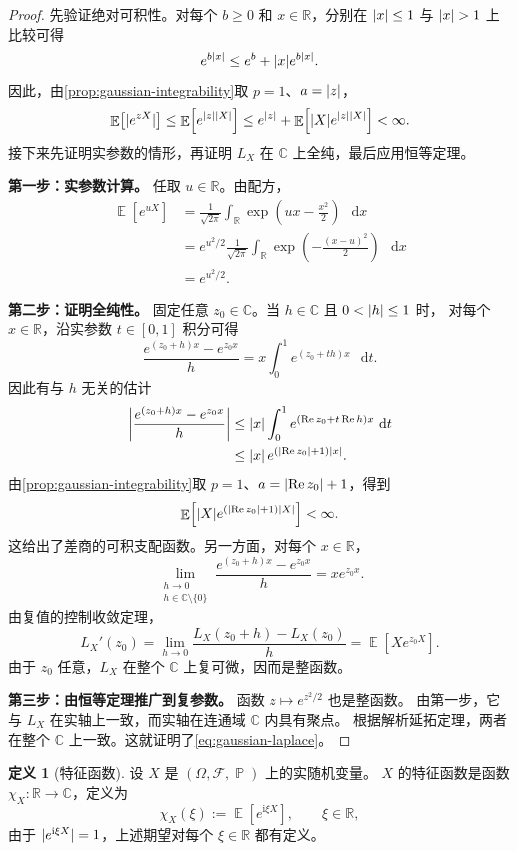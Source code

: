 \documentclass[UTF8,11pt,a4paper,oneside,fontset=fandol]{ctexrep}
\numberwithin{equation}{section}
\theoremstyle{plain}
\theoremstyle{definition}
\newtheorem{definition}[theorem]{定义}
\theoremstyle{remark}
\newcommand{\R}{\mathbb{R}}
\newcommand{\C}{\mathbb{C}}
\newcommand{\F}{\mathcal{F}}
\DeclareMathOperator{\Prob}{\mathbb{P}}
\DeclareMathOperator{\E}{\mathbb{E}}
\newcommand{\dd}{\mathop{}\!\mathrm{d}}
\DeclarePairedDelimiter{\abs}{\lvert}{\rvert}
\begin{document}
\begin{proof}
先验证绝对可积性。对每个 $b\ge0$ 和 $x\in\R$，分别在
$\abs{x}\le1$ 与 $\abs{x}>1$ 上比较可得
\[
  e^{b\abs{x}}\le e^b+\abs{x}e^{b\abs{x}}.
\]
因此，由\cref{prop:gaussian-integrability}取 $p=1$、$a=\abs{z}$，
\[
  \E\!\left[\abs{e^{zX}}\right]
  \le \E\!\left[e^{\abs{z}\abs{X}}\right]
  \le e^{\abs{z}}+\E\!\left[\abs{X}e^{\abs{z}\abs{X}}\right]
  <\infty.
\]
接下来先证明实参数的情形，再证明 $L_X$ 在 $\C$ 上全纯，最后应用恒等定理。

\textbf{第一步：实参数计算。}
任取 $u\in\R$。由配方，
\begin{align*}
  \E\!\left[e^{uX}\right]
  &=\frac{1}{\sqrt{2\pi}}
    \int_{\R}\exp\!\left(ux-\frac{x^2}{2}\right)\,\dd x\\
  &=e^{u^2/2}\frac{1}{\sqrt{2\pi}}
    \int_{\R}\exp\!\left(-\frac{(x-u)^2}{2}\right)\,\dd x\\
  &=e^{u^2/2}.
\end{align*}

\textbf{第二步：证明全纯性。}
固定任意 $z_0\in\C$。当 $h\in\C$ 且 $0<\abs{h}\le1$ 时，
对每个 $x\in\R$，沿实参数 $t\in[0,1]$ 积分可得
\[
  \frac{e^{(z_0+h)x}-e^{z_0x}}{h}
  =x\int_0^1 e^{(z_0+th)x}\,\dd t.
\]
因此有与 $h$ 无关的估计
\begin{align*}
  \abs*{\frac{e^{(z_0+h)x}-e^{z_0x}}{h}}
  &\le \abs{x}\int_0^1
       e^{(\operatorname{Re}z_0+t\operatorname{Re}h)x}\,\dd t\\
  &\le \abs{x}\,
       e^{(\abs{\operatorname{Re}z_0}+1)\abs{x}}.
\end{align*}
由\cref{prop:gaussian-integrability}取
$p=1$、$a=\abs{\operatorname{Re}z_0}+1$，得到
\[
  \E\!\left[
    \abs{X}e^{(\abs{\operatorname{Re}z_0}+1)\abs{X}}
  \right]<\infty.
\]
这给出了差商的可积支配函数。另一方面，对每个 $x\in\R$，
\[
  \lim_{\substack{h\to0\\h\in\C\setminus\{0\}}}
  \frac{e^{(z_0+h)x}-e^{z_0x}}{h}
  =xe^{z_0x}.
\]
由复值的控制收敛定理，
\[
  L_X'(z_0)
  =\lim_{h\to0}\frac{L_X(z_0+h)-L_X(z_0)}{h}
  =\E\!\left[Xe^{z_0X}\right].
\]
由于 $z_0$ 任意，$L_X$ 在整个 $\C$ 上复可微，因而是整函数。

\textbf{第三步：由恒等定理推广到复参数。}
函数 $z\mapsto e^{z^2/2}$ 也是整函数。
由第一步，它与 $L_X$ 在实轴上一致，而实轴在连通域 $\C$ 内具有聚点。
根据解析延拓定理，两者在整个 $\C$ 上一致。这就证明了\cref{eq:gaussian-laplace}。
\end{proof}

\begin{definition}[特征函数]
\label{def:characteristic-function}
设 $X$ 是 $(\Omega,\F,\Prob)$ 上的实随机变量。
$X$ 的特征函数是函数 $\chi_X:\R\to\C$，定义为
\[
  \chi_X(\xi):=\E\!\left[e^{\mathrm{i}\xi X}\right],
  \qquad \xi\in\R,
\]
由于 $\abs{e^{\mathrm{i}\xi X}}=1$，上述期望对每个 $\xi\in\R$ 都有定义。
\end{definition}
\end{document}
